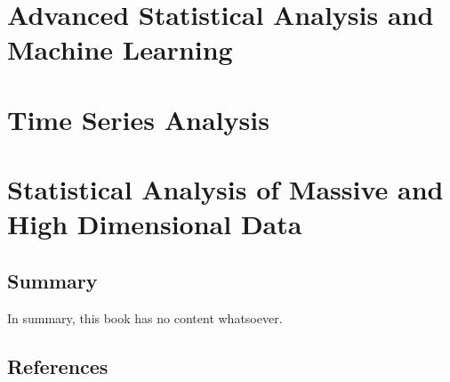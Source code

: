 \documentclass[
  letterpaper,
  DIV=11,
  numbers=noendperiod]{scrreprt}
\begin{document}
\chapter{}\label{section-1}

\part{Advanced Statistical Analysis and Machine Learning}

\chapter{}\label{section-2}

\part{Time Series Analysis}

\chapter{}\label{section-3}

\part{Statistical Analysis of Massive and High Dimensional Data}

\chapter{}\label{section-4}


\chapter{Summary}\label{summary}

In summary, this book has no content whatsoever.


\chapter*{References}\label{references}


\label{refs}
\end{document}

